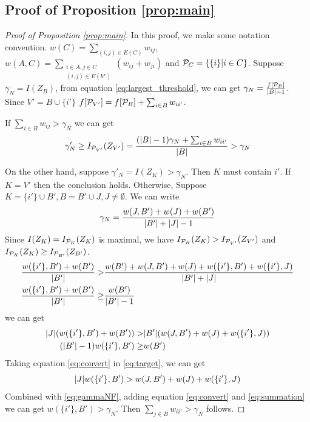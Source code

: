 \subsection{Proof of Proposition \ref{prop:main}}
\begin{proof}[Proof of Proposition \ref{prop:main}]
	In this proof, we make some notation convention.
	$w(C) = \displaystyle\sum_{(i,j) \in E(C)} w_{ij},$
	$w(A, C) = \displaystyle\sum_{\substack{i \in A, j \in C \\ (i,j) \in E(V')}} (w_{ij}+w_{ji})$ and
	$\P_C = \{\{i \}| i \in C \}$. Suppose $\gamma_N = I(Z_B)$, from equation \eqref{eq:largest_threshold}, we can get $\gamma_N =\frac{f[\P_B]} {\abs{B} -1}$.
	Since $V' = B \cup \{i'\}$
	$f[\P_{V'}] = f[\P_B] + \sum_{i \in B}w_{ii'}$.
	
	If $ \sum_{i \in B} w_{ij} > \gamma_N$ we can get
	$$
	\gamma'_N \geq I_{\P_{V'}}(Z_{V'}) = \frac{(\abs{B}-1)\gamma_N + \sum_{i \in B}w_{ii'}}{\abs{B}} > \gamma_N
	$$
	
	On the other hand, suppose $\gamma'_N = I(Z_K) > \gamma_N$. Then $K$ must contain $i'$. If $K=V'$ then the conclusion holds. Otherwise, Suppose $K = \{i'\} \cup B', B=B'\cup J, J\neq \emptyset$. We can write 
	\begin{equation}\label{eq:gammaNF}
	\gamma_N = \frac{w(J,B') + w(J) + w(B')}{ \abs{B'} + \abs{J} - 1 }
	\end{equation}
	Since $I(Z_K) = I_{\P_K}(Z_K)$ is maximal, we have $I_{\P_K}(Z_K) > I_{\P_{V'}}(Z_{V'})$ and $I_{\P_K}(Z_K) \geq I_{\P_{B'}}(Z_{B'})$.
	\begin{align*}
	\frac{w(\{i'\}, B') + w(B')}{\abs{B'}} >& \frac{w(B') + w(J, B') + w(J) + w(\{i'\}, B') + w(\{i'\}, J)}{\abs{B'} + \abs{J}}  \\
	\frac{w(\{i'\}, B') + w(B')}{\abs{B'}} \geq & \frac{w(B')}{\abs{B'} - 1}
	\end{align*}
	we can get 
	\begin{align}
	\abs{J} (w(\{i'\}, B') + w(B')) > & \abs{B'} (w(J, B') + w(J) + w(\{i'\}, J)) \label{eq:target}
	\\
	(\abs{B'} - 1)  w(\{i'\}, B') \geq & w(B') \label{eq:convert}
	\end{align}
	Taking equation \eqref{eq:convert} in \eqref{eq:target}, we can get
	\begin{equation}\label{eq:summation}
	\abs{J} w(\{i'\}, B') > w(J, B') + w(J) + w(\{i'\}, J)
	\end{equation}	
	Combined with \eqref{eq:gammaNF}, adding equation \eqref{eq:convert} and \eqref{eq:summation} we can get
	$w(\{i'\}, B') > \gamma_N$. Then $\sum_{j \in B}w_{ii'} > \gamma_N $ follows.
\end{proof}
